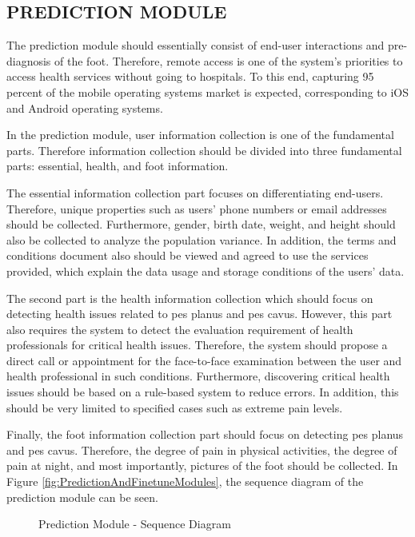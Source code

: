 \subsection{ PREDICTION MODULE }

The prediction module should essentially consist of end-user interactions and pre-diagnosis of the foot. Therefore, remote access is one of the system's priorities to access health services without going to hospitals. To this end, capturing 95 percent of the mobile operating systems market is expected, corresponding to iOS and Android operating systems.

In the prediction module, user information collection is one of the fundamental parts. Therefore information collection should be divided into three fundamental parts: essential, health, and foot information. 

The essential information collection part focuses on differentiating end-users. Therefore, unique properties such as users' phone numbers or email addresses should be collected. Furthermore, gender, birth date, weight, and height should also be collected to analyze the population variance. In addition, the terms and conditions document also should be viewed and agreed to use the services provided, which explain the data usage and storage conditions of the users' data.

The second part is the health information collection which should focus on detecting health issues related to pes planus and pes cavus. However, this part also requires the system to detect the evaluation requirement of health professionals for critical health issues. Therefore, the system should propose a direct call or appointment for the face-to-face examination between the user and health professional in such conditions. Furthermore, discovering critical health issues should be based on a rule-based system to reduce errors. In addition, this should be very limited to specified cases such as extreme pain levels.

Finally, the foot information collection part should focus on detecting pes planus and pes cavus. Therefore, the degree of pain in physical activities, the degree of pain at night, and most importantly, pictures of the foot should be collected. In Figure \ref{fig:PredictionAndFinetuneModules}, the sequence diagram of the prediction module can be seen.

\begin{figure}[htbp]
\centering
{}
\caption{Prediction Module - Sequence Diagram}
\label{fig:PredictionModuleSequenceDiagram}
\end{figure}

